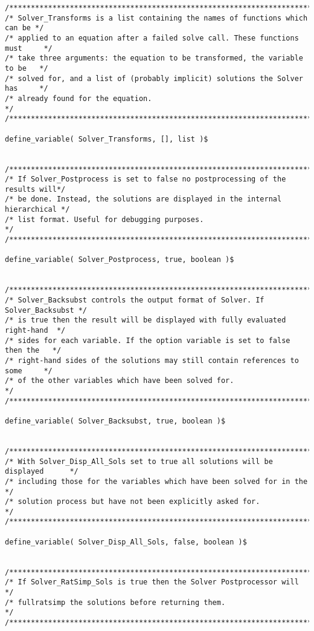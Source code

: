 \begin{verbatim}
/******************************************************************************/
/* Solver_Transforms is a list containing the names of functions which can be */
/* applied to an equation after a failed solve call. These functions must     */
/* take three arguments: the equation to be transformed, the variable to be   */
/* solved for, and a list of (probably implicit) solutions the Solver has     */
/* already found for the equation.                                            */
/******************************************************************************/

define_variable( Solver_Transforms, [], list )$


/******************************************************************************/
/* If Solver_Postprocess is set to false no postprocessing of the results will*/
/* be done. Instead, the solutions are displayed in the internal hierarchical */
/* list format. Useful for debugging purposes.                                */
/******************************************************************************/

define_variable( Solver_Postprocess, true, boolean )$


/******************************************************************************/
/* Solver_Backsubst controls the output format of Solver. If Solver_Backsubst */
/* is true then the result will be displayed with fully evaluated right-hand  */
/* sides for each variable. If the option variable is set to false then the   */
/* right-hand sides of the solutions may still contain references to some     */
/* of the other variables which have been solved for.                         */
/******************************************************************************/

define_variable( Solver_Backsubst, true, boolean )$


/******************************************************************************/
/* With Solver_Disp_All_Sols set to true all solutions will be displayed      */
/* including those for the variables which have been solved for in the        */
/* solution process but have not been explicitly asked for.                   */
/******************************************************************************/

define_variable( Solver_Disp_All_Sols, false, boolean )$


/******************************************************************************/
/* If Solver_RatSimp_Sols is true then the Solver Postprocessor will          */
/* fullratsimp the solutions before returning them.                           */
/******************************************************************************/


\end{verbatim}
